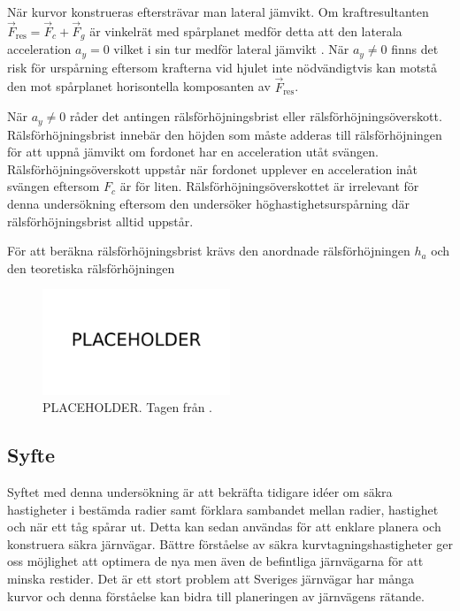 När kurvor konstrueras eftersträvar man lateral jämvikt. Om kraftresultanten $\vec F_\mathrm{res} = \vec F_c + \vec F_g$ är vinkelrät med spårplanet medför detta att den laterala acceleration $a_y=0$ vilket i sin tur medför lateral jämvikt \parencite{carlos}. När $a_y\neq0$ finns det risk för urspårning eftersom krafterna vid hjulet inte nödvändigtvis kan motstå den mot spårplanet horisontella komposanten av $\vec F_\mathrm{res}$.

När $a_y\neq 0$ råder det antingen rälsförhöjningsbrist eller rälsförhöjningsöverskott. Rälsförhöjningsbrist innebär den höjden som måste adderas till rälsförhöjningen för att uppnå jämvikt om fordonet har en acceleration utåt svängen. Rälsförhöjningsöverskott uppstår när fordonet upplever en acceleration inåt svängen eftersom $F_c$ är för liten. Rälsförhöjningsöverskottet är irrelevant för denna undersökning eftersom den undersöker höghastighetsurspårning där rälsförhöjningsbrist alltid uppstår.

För att beräkna rälsförhöjningsbrist krävs den anordnade rälsförhöjningen $h_a$ och den teoretiska rälsförhöjningen


\begin{figure}[h]
    \centering
    \includegraphics[width=0.5\textwidth]{fig/placeholder.png}
    \caption{PLACEHOLDER. Tagen från \textcite{carlos}.}
    \label{fig:tågkrafter_doserad}
\end{figure}

\subsection{Syfte}
Syftet med denna undersökning är att bekräfta tidigare idéer om säkra hastigheter i bestämda radier samt förklara sambandet mellan radier, hastighet och när ett tåg spårar ut. Detta kan sedan användas för att enklare planera och konstruera säkra järnvägar. Bättre förståelse av säkra kurvtagningshastigheter ger oss möjlighet att optimera de nya men även de befintliga järnvägarna för att minska restider. Det är ett stort problem att Sveriges järnvägar har många kurvor \parencite{} och denna förståelse kan bidra till planeringen av järnvägens rätande. 

